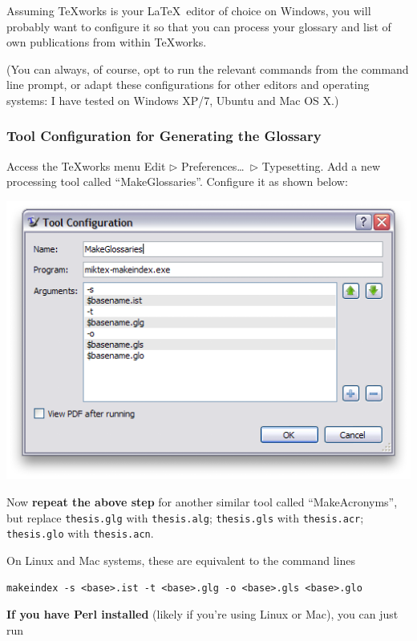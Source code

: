 Assuming \textsf{TeXworks} is your \LaTeX\ editor of choice on Windows, you will probably want to configure it so that you can process your glossary and list of own publications from within \textsf{TeXworks}.

(You can always, of course, opt to run the relevant commands from the command line prompt, or adapt these configurations for other editors and operating systems: I have tested on Windows XP/7, Ubuntu and Mac OS X.)

\subsubsection{Tool Configuration for Generating the Glossary}\label{sec:texworks:makeglossaries}
Access the \textsf{TeXworks} menu \textsf{Edit $\triangleright$ Preferences\ldots\ $\triangleright$ Typesetting}. Add a new processing tool called ``\textsf{MakeGlossaries}''. Configure it as shown below:

\includegraphics[width=.9\textwidth]{texworks-win_glossaries}

Now \textbf{repeat the above step} for another similar tool called ``\textsf{MakeAcronyms}'', but replace \texttt{thesis.glg} with \texttt{thesis.alg}; \texttt{thesis.gls} with \texttt{thesis.acr}; \texttt{thesis.glo} with \texttt{thesis.acn}.

On Linux and Mac systems, these are equivalent to the command lines

\begin{lstlisting}
makeindex -s <base>.ist -t <base>.glg -o <base>.gls <base>.glo
\end{lstlisting}


\textbf{If you have Perl installed} (likely if you're using Linux or Mac), you can just run

